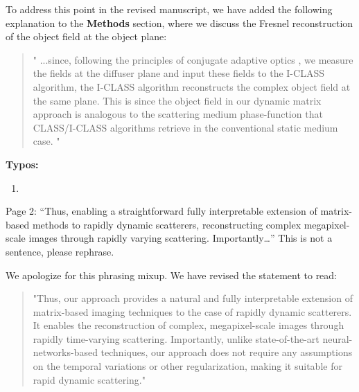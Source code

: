 \documentclass[12pt]{article}
\newenvironment{solved_reviewercomment}
    {\begin{tcolorbox}[width=\linewidth,colback=gray!5,colframe=solved_commentcolor!50,title=Reviewer Comment,left=5pt,right=5pt]}
    {\end{tcolorbox}}
\newenvironment{ourresponse}
    {\begin{tcolorbox}[width=\linewidth,breakable,enhanced,colback=gray!5,colframe=responsecolor!50,title=Response,left=5pt,right=5pt]}
    {\end{tcolorbox}}
\begin{document}
\begin{ourresponse}
    To address this point in the revised manuscript, we have added the following explanation to the\textbf{ Methods} section, where we discuss the Fresnel reconstruction of the object field at the object plane:

    \begin{quote}
        "
        ...since, following the principles of conjugate adaptive optics \cite{mertz2015field, kwon2023computational, sunray2024beyond, Katz2012looking}, we measure the fields at the diffuser plane and input these fields to the I-CLASS algorithm, the I-CLASS algorithm reconstructs the complex object field at the same plane. This is since the object field in our dynamic matrix approach is analogous to the scattering medium phase-function that CLASS/I-CLASS algorithms retrieve in the conventional static medium case.
        "
    \end{quote}

\end{ourresponse}


\textbf{Typos:}

\begin{enumerate}[label=\arabic*., resume]
\item \leavevmode
\end{enumerate}
\vspace{-1em}
\begin{solved_reviewercomment}
    Page 2: “Thus, enabling a straightforward fully interpretable extension of matrix-based methods to rapidly dynamic scatterers, reconstructing complex megapixel-scale images through rapidly varying scattering. Importantly…” This is not a sentence, please rephrase.
\end{solved_reviewercomment}

\begin{ourresponse}
    We apologize for this phrasing mixup. We have revised the statement to read:
    
    \begin{quote}
        "Thus, our approach provides a natural and fully interpretable extension of matrix-based imaging techniques to the case of rapidly dynamic scatterers. 
        It enables the reconstruction of complex, megapixel-scale images through rapidly time-varying scattering. Importantly, unlike state-of-the-art neural-networks-based techniques, our approach does not require any assumptions on the temporal variations or other regularization, making it suitable for rapid dynamic scattering."
    \end{quote}
    
\end{ourresponse}
\end{document}
